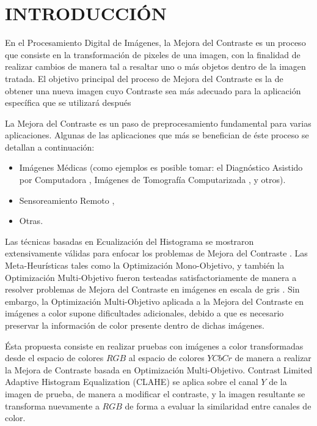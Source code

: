 \chapter{INTRODUCCIÓN}

En el Procesamiento Digital de Imágenes, la Mejora del Contraste es un proceso que consiste en la transformación de pixeles de una imagen, con la finalidad de realizar cambios de manera tal a resaltar uno o más objetos dentro de la imagen tratada. El objetivo principal del proceso de Mejora del Contraste es la de obtener una nueva imagen cuyo Contraste sea más adecuado para la aplicación específica que se utilizará después \cite{gonzalez02a}

La Mejora del Contraste es un paso de preprocesamiento fundamental para varias aplicaciones. Algunas de las aplicaciones que más se benefician de éste proceso se detallan a continuación:

\begin{itemize}
	\item Imágenes Médicas (como ejemplos es posible tomar: el Diagnóstico Asistido por Computadora \cite{doi2007computer}, Imágenes de Tomografía Computarizada \cite{doi:10.1056/NEJM199303113281008}, y otros).
	\item Sensoreamiento Remoto \cite{lillesand2014remote},

	\item Otras.
	
\end{itemize}

Las técnicas basadas en Ecualización del Histograma se mostraron extensivamente válidas para enfocar los problemas de Mejora del Contraste \cite{pizer1987adaptive,zuiderveld1994contrast,580378}. %
Las Meta-Heurísticas tales como la Optimización Mono-Objetivo, y también la Optimización Multi-Objetivo fueron testeadas satisfactoriamente de manera a resolver problemas de Mejora del Contraste en imágenes en escala de gris \cite{morepso,more2015parameter,812529,HOSEINI2013879}. Sin embargo, la Optimización Multi-Objetivo aplicada a la Mejora del Contraste en imágenes a color supone dificultades adicionales, debido a que es necesario preservar la información de color presente dentro de dichas imágenes.

Ésta propuesta consiste en realizar pruebas con imágenes a color transformadas desde el espacio de colores $RGB$ al espacio de colores $YCbCr$ de manera a realizar la Mejora de Contraste basada en Optimización Multi-Objetivo. Contrast Limited Adaptive Histogram Equalization (CLAHE) se aplica sobre el canal $Y$ de la imagen de prueba, de manera a modificar el contraste, y la imagen resultante se transforma nuevamente a $RGB$ de forma a evaluar la similaridad entre canales de color.

